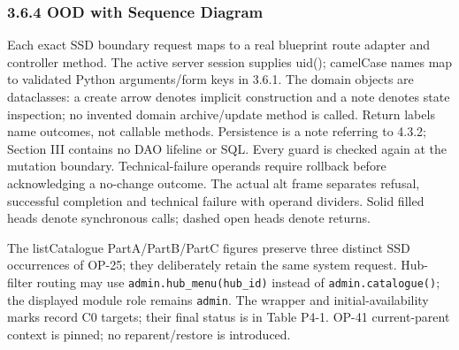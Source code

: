 \subsubsection*{3.6.4 OOD with Sequence Diagram}
Each exact SSD boundary request maps to a real blueprint route adapter and controller method. The active server session supplies uid(); camelCase names map to validated Python arguments/form keys in 3.6.1. The domain objects are dataclasses: a create arrow denotes implicit construction and a note denotes state inspection; no invented domain archive/update method is called. Return labels name outcomes, not callable methods. Persistence is a note referring to 4.3.2; Section III contains no DAO lifeline or SQL. Every guard is checked again at the mutation boundary. Technical-failure operands require rollback before acknowledging a no-change outcome. The actual alt frame separates refusal, successful completion and technical failure with operand dividers. Solid filled heads denote synchronous calls; dashed open heads denote returns.

The listCatalogue PartA/PartB/PartC figures preserve three distinct SSD occurrences of OP-25; they deliberately retain the same system request. Hub-filter routing may use \texttt{admin.\allowbreak{}hub\_\allowbreak{}menu(hub\_\allowbreak{}id)} instead of \texttt{admin.\allowbreak{}catalogue()}; the displayed module role remains \texttt{admin}. The wrapper and initial-availability marks record C0 targets; their final status is in Table P4-1. OP-41 current-parent context is pinned; no reparent/restore is introduced.

